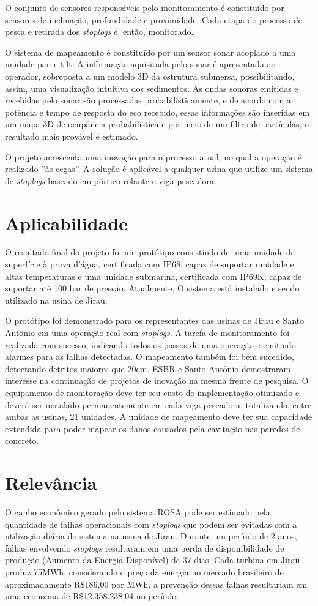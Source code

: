 \begin{itemize}
O conjunto de sensores responsáveis pelo monitoramento é constituído por
sensores de inclinação, profundidade e proximidade. Cada etapa do processo de
pesca e retirada dos \textit{stoplogs} é, então, monitorado.

O sistema de mapeamento é constituído por um sensor sonar acoplado a uma unidade
pan e tilt. A informação aquisitada pelo sonar é apresentada ao operador,
sobreposta a um modelo 3D da estrutura submersa, possibilitando, assim, uma
visualização intuitiva dos sedimentos. As ondas sonoras emitidas e recebidas pelo sonar são
processadas probabilisticamente, e de acordo com a potência e tempo de resposta
do eco recebido, essas informações são inseridas em um mapa 3D de ocupância
probabilística e por meio de um filtro de partículas, o resultado mais provável
é estimado.

O projeto acrescenta uma inovação para o processo atual, no qual a operação é
realizado ''às cegas''. A solução é aplicável a qualquer usina que utilize um
sistema de \textit{stoplogs} baseado em pórtico rolante e viga-pescadora.


\section*{Aplicabilidade}

O resultado final do projeto foi um protótipo consistindo de: uma unidade de
superfície à prova d'água, certificada com IP68, capaz de suportar umidade e
altas temperaturas e uma unidade submarina, certificada com IP69K, capaz de
suportar até 100 bar de pressão. Atualmente, O sistema está instalado e sendo
utilizado na usina de Jirau.

O protótipo foi demonstrado para os representantes das usinas de Jirau e Santo
Antônio em uma operação real com \textit{stoplogs}. A tarefa de monitoramento
foi realizada com sucesso, indicando todos os passos de uma operação e emitindo
alarmes para as falhas detectadas. O mapeamento também foi bem sucedido,
detectando detritos maiores que 20cm. ESBR e Santo Antônio demostraram interesse
na continuação de projetos de inovação na mesma frente de pesquisa. O
equipamento de monitoração deve ter seu custo de implementação otimizado e
deverá ser instalado permanentemente em cada viga pescadora, totalizando, entre
ambas as usinas, 21 unidades. A unidade de mapeamento deve ter sua capacidade
extendida para poder mapear os danos causados pela cavitação nas paredes de
concreto.
 
\section*{Relevância}
O ganho econômico gerado pelo sistema ROSA pode ser estimado pela quantidade de
falhas operacionais com \textit{stoplogs} que podem ser evitadas com a
utilização diária do sistema na usina de Jirau. Durante um período de 2 anos,
falhas envolvendo \textit{stoplogs} resultaram em uma perda de disponibilidade
de produção (Aumento da Energia Disponível) de 37 dias. Cada turbina
em Jirau produz 75MWh, considerando o preço da energia no mercado brasileiro de
aproximadamente R\$186,00 por MWh, a prevenção dessas falhas resultariam em uma
economia de R\$12.358.238,04 no período.


\end{itemize}
